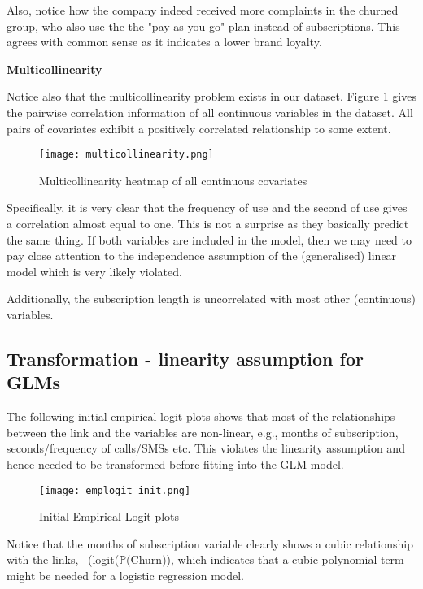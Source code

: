 \documentclass[11pt]{article}
\begin{document}
Also, notice how the company indeed received more complaints in the churned group, who also use the the "pay as you go" plan instead of subscriptions. This agrees with common sense as it indicates a lower brand loyalty. 

\textbf{Multicollinearity}

Notice also that the multicollinearity problem exists in our dataset. Figure \ref{fig:multicolin} gives the pairwise correlation information of all continuous variables in the dataset. All pairs of covariates exhibit a positively correlated relationship to some extent. 

\begin{figure}
    \centering
    \texttt{[image: multicollinearity.png]}
    \caption{Multicollinearity heatmap of all continuous covariates}
    \label{fig:multicolin}
\end{figure}

Specifically, it is very clear that the frequency of use and the second of use gives a correlation almost equal to one. This is not a surprise as they basically predict the same thing. If both variables are included in the model, then we may need to pay close attention to the independence assumption of the (generalised) linear model which is very likely violated. 

Additionally, the subscription length is uncorrelated with most other (continuous) variables. 

\subsection{Transformation - linearity assumption for GLMs}

The following initial empirical logit plots shows that most of the relationships between the link and the variables are non-linear, e.g., months of subscription, seconds/frequency of calls/SMSs etc. This violates the linearity assumption and hence needed to be transformed before fitting into the GLM model. 

\begin{figure}[H]
    \centering
    \texttt{[image: emplogit\_init.png]}
    \caption{Initial Empirical Logit plots}
    \label{fig:enter-label}
\end{figure}

Notice that the months of subscription variable clearly shows a cubic relationship with the links, \
(logit($\mathbb{P}($Churn$)$), which indicates that a cubic polynomial term might be needed for a logistic regression model. 
\end{document}
